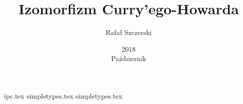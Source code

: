 \documentclass[a4paper,oneside,reqno,10pt]{article}
\title{Izomorfizm Curry'ego-Howarda}
\date{2018\\ Październik}
\author{Rafał Szczerski}
\begin{document}
\maketitle
{ipc.tex}
{simpletypes.tex}
{simpletypes.tex}


\end{document}
